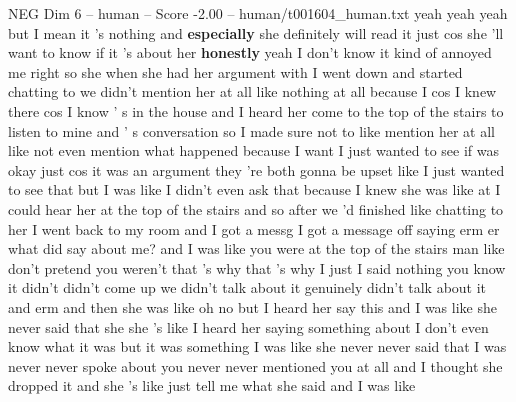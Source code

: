 \begin{textsample}{NEG Dim 6 – human – Score -2.00 – human/t001604\_human.txt}  \label{ex:f6_neg_034}
yeah yeah yeah but I mean it 's nothing and \textbf{especially} she definitely will read it just cos she 'll want to know if it 's about her \textbf{honestly} yeah I don't know it kind of annoyed me right so she when she had her argument with I went down and started chatting to we didn't mention her at all like nothing at all because I cos I knew there cos I know ' s in the house and I heard her come to the top of the stairs to listen to mine and ' s conversation so I made sure not to like mention her at all like not even mention what happened because I want I just wanted to see if was okay just cos it was an argument they 're both gonna be upset like I just wanted to see that but I was like I didn't even ask that because I knew she was like at I could hear her at the top of the stairs and so after we 'd finished like chatting to her I went back to my room and I got a messg I got a message off saying erm er what did say about me? and I was like you were at the top of the stairs man like don't pretend you weren't that 's why that 's why I just I said nothing you know it didn't didn't come up we didn't talk about it genuinely didn't talk about it and erm and then she was like oh no but I heard her say this and I was like she never said that she she 's like I heard her saying something about I don't even know what it was but it was something I was like she never never said that I was never never spoke about you never never mentioned you at all and I thought she dropped it and she 's like just tell me what she said and I was like

\end{textsample}

